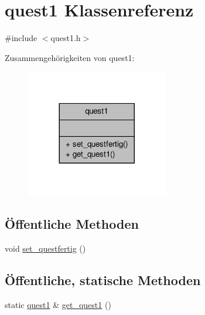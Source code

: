 \hypertarget{classquest1}{\section{quest1 Klassenreferenz}
\label{classquest1}
}


{\ttfamily \#include $<$quest1.\-h$>$}



Zusammengehörigkeiten von quest1\-:
\nopagebreak
\begin{figure}[H]
\begin{center}
\leavevmode
\includegraphics[width=176pt]{classquest1__coll__graph}
\end{center}
\end{figure}
\subsection*{Öffentliche Methoden}
\begin{DoxyCompactItemize}
\item 
void \hyperlink{classquest1_a0d15ef2a709da84e40eeebfe9d013ca2}{set\-\_\-questfertig} ()
\end{DoxyCompactItemize}
\subsection*{Öffentliche, statische Methoden}
\begin{DoxyCompactItemize}
\item 
static \hyperlink{classquest1}{quest1} \& \hyperlink{classquest1_a042d65f81c5ab7a6766dacd68f268613}{get\-\_\-quest1} ()
\end{DoxyCompactItemize}



